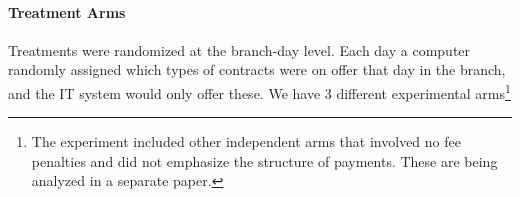 \documentclass[12pt, a4paper]{article}
\begin{document}

\paragraph*{Treatment Arms} 
Treatments were randomized at the branch-day level. Each day a computer randomly assigned which types of contracts were on offer that day in the branch, and the IT system would only offer these.  We have 3 different experimental arms\footnote{The experiment included other independent arms that involved no fee penalties and did not emphasize the structure of payments. These are being analyzed in a separate paper.} 
\end{document}
